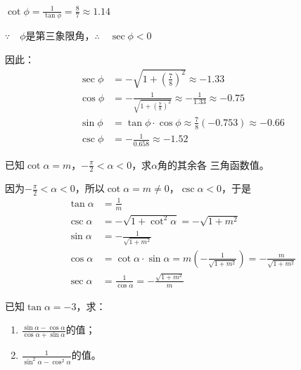 \begin{solution}
$\cot\phi=\frac{1}{\tan\phi}=\frac{8}{7}\approx 1.14$

$\because\quad \phi$是第三象限角，$\therefore\quad \sec\phi<0$

因此：
\[\begin{split}
    \sec\phi&=-\sqrt{1+\left(\frac{7}{8}\right)^2}\approx -1.33\\
    \cos\phi&=-\frac{1}{\sqrt{1+\left(\frac{7}{8}\right)^2}}\approx-\frac{1}{1.33}\approx -0.75\\
    \sin\phi&=\tan\phi\cdot \cos\phi\approx \frac{7}{8}(-0.753)\approx -0.66\\
    \csc\phi&=-\frac{1}{0.658}\approx -1.52
\end{split}\]
\end{solution}



\begin{example}
    已知$\cot\alpha=m$，$-\frac{\pi}{2}<\alpha<0$，求$\alpha$角的其余各
三角函数值。
\end{example}

\begin{solution}
因为$-\frac{\pi}{2}<\alpha<0$，所以$\cot\alpha=m\ne 0$，$\csc\alpha<0$，于是
\[\begin{split}
    \tan\alpha&=\frac{1}{m}\\
\csc\alpha&=-\sqrt{1+\cot^2\alpha}=-\sqrt{1+m^2}\\
\sin\alpha&=-\frac{1}{\sqrt{1+m^2}}\\
\cos\alpha&=\cot\alpha\cdot \sin\alpha=m\left(-\frac{1}{\sqrt{1+m^2}}\right)=-\frac{m}{\sqrt{1+m^2}}\\
\sec\alpha&=\frac{1}{\cos\alpha}=-\frac{\sqrt{1+m^2}}{m}
\end{split}\]
\end{solution}

\begin{example}
    已知$\tan\alpha=-3$，求：
    \begin{enumerate}
        \item $\frac{\sin\alpha-\cos\alpha}{\cos\alpha+\sin\alpha}$的值；
        \item $\frac{1}{\sin^2\alpha-\cos^2\alpha}$的值。
    \end{enumerate}
\end{example}

